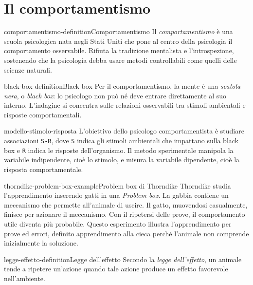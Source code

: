 \documentclass[preview]{standalone}
\begin{document}
\genpage

\section{Il comportamentismo}

\begin{snippetdefinition}{comportamentismo-definition}{Comportamentismo}
    Il \emph{comportamentismo} è una scuola psicologica nata negli Stati Uniti
    che pone al centro della psicologia il comportamento osservabile. Rifiuta
    la tradizione mentalista e l'introspezione, sostenendo che la psicologia
    debba usare metodi controllabili come quelli delle scienze naturali.
\end{snippetdefinition}

\begin{snippetdefinition}{black-box-definition}{Black box}
    Per il comportamentismo, la mente è una \emph{scatola nera}, o
    \emph{black box}: lo psicologo non può né deve entrare direttamente al suo
    interno. L'indagine si concentra sulle relazioni osservabili tra stimoli
    ambientali e risposte comportamentali.
\end{snippetdefinition}

\begin{snippet}{modello-stimolo-risposta}
    L'obiettivo dello psicologo comportamentista è studiare associazioni
    \texttt{S-R}, dove \texttt{S} indica gli stimoli ambientali che impattano
    sulla black box e \texttt{R} indica le risposte dell'organismo. Il metodo
    sperimentale manipola la variabile indipendente, cioè lo stimolo, e misura
    la variabile dipendente, cioè la risposta comportamentale.
\end{snippet}

\begin{snippetexample}{thorndike-problem-box-example}{Problem box di Thorndike}
    Thorndike studia l'apprendimento inserendo gatti in una \emph{Problem box}.
    La gabbia contiene un meccanismo che permette all'animale di uscire. Il
    gatto, muovendosi casualmente, finisce per azionare il meccanismo. Con il
    ripetersi delle prove, il comportamento utile diventa più probabile. Questo
    esperimento illustra l'apprendimento per prove ed errori, definito
    apprendimento alla cieca perché l'animale non comprende inizialmente la
    soluzione.
\end{snippetexample}

\begin{snippetdefinition}{legge-effetto-definition}{Legge dell'effetto}
    Secondo la \emph{legge dell'effetto}, un animale tende a ripetere un'azione
    quando tale azione produce un effetto favorevole nell'ambiente.
\end{snippetdefinition}
\end{document}
